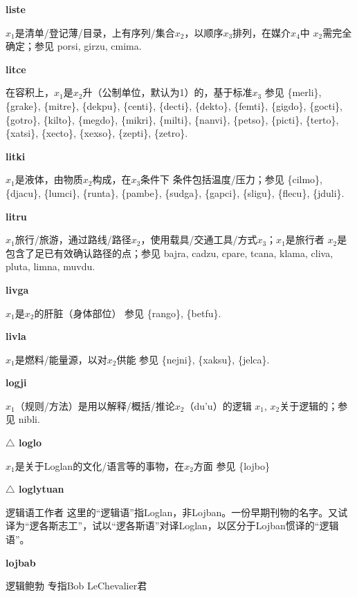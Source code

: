 \documentclass[notitlepage,twocolumn,a4paper,10pt]{book}
\begin{document}
{\sffamily\bfseries liste}\enspace {\ttfamily\bfseries[    ste]}  $x_1$是清单\slash{}登记薄\slash{}目录，上有序列\slash{}集合$x_2$，以顺序$x_3$排列，在媒介$x_4$中 \textemdash{} $x_2$需完全确定；参见 {porsi}, {girzu}, {cmima}.

{\sffamily\bfseries litce}\enspace {\ttfamily\bfseries[lic]}  在容积上，$x_1$是$x_2$升（公制单位，默认为1）的，基于标准$x_3$ \textemdash{} 参见 \{merli\}, \{grake\}, \{mitre\}, \{dekpu\}, \{centi\}, \{decti\}, \{dekto\}, \{femti\}, \{gigdo\}, \{gocti\}, \{gotro\}, \{kilto\}, \{megdo\}, \{mikri\}, \{milti\}, \{nanvi\}, \{petso\}, \{picti\}, \{terto\}, \{xatsi\}, \{xecto\}, \{xexso\}, \{zepti\}, \{zetro\}.

{\sffamily\bfseries litki}\enspace {\ttfamily\bfseries[lik]}  $x_1$是液体，由物质$x_2$构成，在$x_3$条件下 \textemdash{} 条件包括温度\slash{}压力；参见 \{cilmo\}, \{djacu\}, \{lumci\}, \{runta\}, \{pambe\}, \{sudga\}, \{gapci\}, \{sligu\}, \{flecu\}, \{jduli\}.

{\sffamily\bfseries litru}\enspace {\ttfamily\bfseries[        li'u]}  $x_1$旅行\slash{}旅游，通过路线\slash{}路径$x_2$，使用载具\slash{}交通工具\slash{}方式$x_3$；$x_1$是旅行者 \textemdash{} $x_2$是包含了足已有效确认路径的点；参见 {bajra}, {cadzu}, {cpare}, {tcana}, {klama}, {cliva}, {pluta}, {limna}, {muvdu}.

{\sffamily\bfseries livga} $x_1$是$x_2$的肝脏（身体部位） \textemdash{} 参见 \{rango\}, \{betfu\}.

{\sffamily\bfseries livla}\enspace {\ttfamily\bfseries[lil]}  $x_1$是燃料\slash{}能量源，以对$x_2$供能 \textemdash{} 参见 \{nejni\}, \{xaksu\}, \{jelca\}.

{\sffamily\bfseries logji}\enspace {\ttfamily\bfseries[loj]}  $x_1$（规则\slash{}方法）是用以解释\slash{}概括\slash{}推论$x_2$（du'u）的逻辑 \textemdash{} $x_1$, $x_2$关于逻辑的；参见 {nibli}.

{\sffamily\bfseries $\triangle$ loglo} $x_1$是关于Loglan的文化\slash{}语言等的事物，在$x_2$方面 \textemdash{} 参见 \{lojbo\}

{\sffamily\bfseries $\triangle$ loglytuan} 逻辑语工作者 \textemdash{} 这里的“逻辑语”指Loglan，非Lojban。一份早期刊物的名字。又试译为“逻各斯志工”，试以“逻各斯语”对译Loglan，以区分于Lojban惯译的“逻辑语”。

{\sffamily\bfseries lojbab} 逻辑鲍勃 \textemdash{} 专指Bob LeChevalier君
\end{document}
